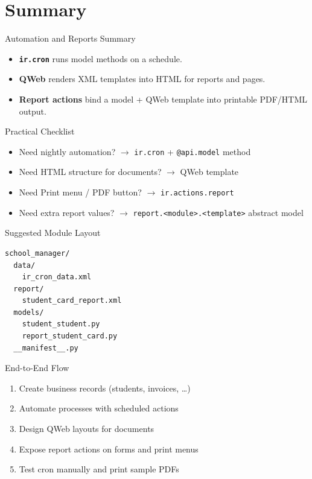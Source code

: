 \section{Summary}

\begin{frame}{Automation and Reports Summary}
	\begin{itemize}
		\item \textbf{\texttt{ir.cron}} runs model methods on a schedule.
		\item \textbf{QWeb} renders XML templates into HTML for reports and pages.
		\item \textbf{Report actions} bind a model + QWeb template into printable PDF/HTML output.
	\end{itemize}
\end{frame}

\begin{frame}{Practical Checklist}
	\begin{itemize}
		\item Need nightly automation? $\rightarrow$ \texttt{ir.cron} + \texttt{@api.model} method
		\item Need HTML structure for documents? $\rightarrow$ QWeb template
		\item Need Print menu / PDF button? $\rightarrow$ \texttt{ir.actions.report}
		\item Need extra report values? $\rightarrow$ \texttt{report.<module>.<template>} abstract model
	\end{itemize}
\end{frame}

\begin{frame}[fragile]{Suggested Module Layout}
\begin{lstlisting}
school_manager/
  data/
    ir_cron_data.xml
  report/
    student_card_report.xml
  models/
    student_student.py
    report_student_card.py
  __manifest__.py
\end{lstlisting}
\end{frame}

\begin{frame}{End-to-End Flow}
	\begin{enumerate}
		\item Create business records (students, invoices, \ldots)
		\item Automate processes with scheduled actions
		\item Design QWeb layouts for documents
		\item Expose report actions on forms and print menus
		\item Test cron manually and print sample PDFs
	\end{enumerate}
\end{frame}
